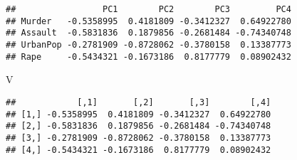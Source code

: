 \documentclass[]{article}
\newenvironment{Shaded}{\begin{snugshade}}{\end{snugshade}}
\newcommand{\StringTok}[1]{\textcolor[rgb]{0.31,0.60,0.02}{#1}}
\newcommand{\CommentTok}[1]{\textcolor[rgb]{0.56,0.35,0.01}{\textit{#1}}}
\newcommand{\OperatorTok}[1]{\textcolor[rgb]{0.81,0.36,0.00}{\textbf{#1}}}
\newcommand{\NormalTok}[1]{#1}
\begin{document}
\begin{verbatim}
##                 PC1        PC2        PC3         PC4
## Murder   -0.5358995  0.4181809 -0.3412327  0.64922780
## Assault  -0.5831836  0.1879856 -0.2681484 -0.74340748
## UrbanPop -0.2781909 -0.8728062 -0.3780158  0.13387773
## Rape     -0.5434321 -0.1673186  0.8177779  0.08902432
\end{verbatim}

\begin{Shaded}
\begin{Highlighting}[]
\NormalTok{V}
\end{Highlighting}
\end{Shaded}

\begin{verbatim}
##            [,1]       [,2]       [,3]        [,4]
## [1,] -0.5358995  0.4181809 -0.3412327  0.64922780
## [2,] -0.5831836  0.1879856 -0.2681484 -0.74340748
## [3,] -0.2781909 -0.8728062 -0.3780158  0.13387773
## [4,] -0.5434321 -0.1673186  0.8177779  0.08902432
\end{verbatim}

\begin{Shaded}
\end{Shaded}
\end{document}
